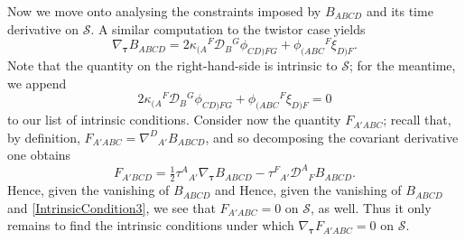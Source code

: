 \documentclass[10pt,a4paper]{article}
\theoremstyle{plain}
\begin{document}
\medskip

Now we move onto analysing the constraints imposed by $B_{ABCD}$ and
its time derivative on $\mathcal{S}$.  A similar computation to the
twistor case yields
\begin{equation}
    \nabla_{\bm\tau} B_{ABCD} = 2
    \kappa_{(A}{}^{F}\mathcal{D}_{B}{}^{G}\phi_{CD)FG} +
    \phi_{(ABC}{}^{F}\xi_{D)F}.\label{EvolutionForBuchdahl}
\end{equation}
Note that the quantity on the right-hand-side is intrinsic to
$\mathcal{S}$; for the meantime, we append
\begin{equation}
2 \kappa_{(A}{}^{F}\mathcal{D}_{B}{}^{G}\phi_{CD)FG} + \phi_{(ABC}{}^{F}\xi_{D)F}=0\label{IntrinsicCondition3}
\end{equation}
to our list of intrinsic
conditions.
Consider now the quantity
$F_{A'ABC}$; recall that, by definition,
$F_{A'ABC}=\nabla^D{}_{A'}B_{ABCD}$, and so decomposing the covariant
derivative one obtains
\[F_{A'BCD} = \tfrac{1}{2} \tau^{A}{}_{A'} \nabla_{\bm\tau} B_{ABCD}  -  \tau^{F}{}_{A'} \mathcal{D}^{A}{}_{F}B_{ABCD}.\]
Hence, given the vanishing of $B_{ABCD}$ and Hence, given the vanishing of $B_{ABCD}$ and \eqref{IntrinsicCondition3}, we see that $F_{A'ABC}=0$ on
$\mathcal{S}$, as well.
Thus it only remains to find the intrinsic 
conditions under which $\nabla_{\bm\tau}F_{A'ABC}=0$ on
$\mathcal{S}$.
\end{document}
